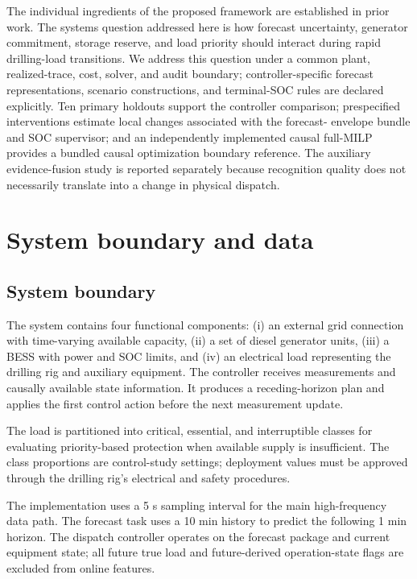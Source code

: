 The individual ingredients of the proposed framework are established in prior
work. The systems question addressed here is how forecast uncertainty, generator
commitment, storage reserve, and load priority should interact during rapid
drilling-load transitions. We address this question under a common plant,
realized-trace, cost, solver, and audit boundary; controller-specific forecast
representations, scenario constructions, and terminal-SOC rules are declared
explicitly. Ten primary holdouts support the controller comparison;
prespecified interventions estimate local changes associated with the forecast-
envelope bundle and SOC supervisor; and an independently implemented causal
full-MILP provides a bundled causal optimization boundary reference. The auxiliary
evidence-fusion study is reported separately because recognition quality does
not necessarily translate into a change in physical dispatch.

\section{System boundary and data}\label{system-boundary-and-data}

\subsection{System boundary}\label{system-boundary}

The system contains four functional components: (i) an external grid
connection with time-varying available capacity, (ii) a set of diesel
generator units, (iii) a BESS with power and SOC limits, and (iv) an
electrical load representing the drilling rig and auxiliary equipment.
The controller receives measurements and causally available state
information. It produces a receding-horizon plan and applies the first
control action before the next measurement update.

The load is partitioned into critical, essential, and interruptible classes
for evaluating priority-based protection when available supply is
insufficient. The class proportions are control-study settings; deployment
values must be approved through the drilling rig's electrical and safety
procedures.

The implementation uses a 5 s sampling interval for the main
high-frequency data path. The forecast task uses a 10 min history to
predict the following 1 min horizon. The dispatch controller operates on
the forecast package and current equipment state; all future true load
and future-derived operation-state flags are excluded from online
features.

